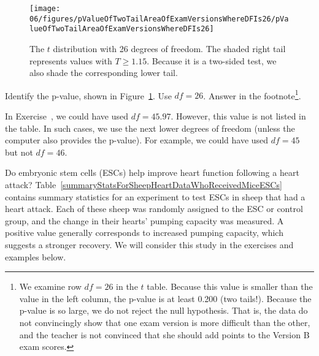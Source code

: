 \begin{figure}
\centering
\texttt{[image: 06/figures/pValueOfTwoTailAreaOfExamVersionsWhereDFIs26/pValueOfTwoTailAreaOfExamVersionsWhereDFIs26]}
\caption{The $t$ distribution with 26 degrees of freedom. The shaded right tail represents values with $T \geq 1.15$. Because it is a two-sided test, we also shade the corresponding lower tail.}
\label{pValueOfTwoTailAreaOfExamVersionsWhereDFIs26}
\end{figure}

\begin{exercise} \label{computeTwoTailAreaOfExamVersionsWhereDFIs26}
Identify the p-value, shown in Figure~\ref{pValueOfTwoTailAreaOfExamVersionsWhereDFIs26}. Use $df=26$. Answer in the footnote\footnote{We examine row $df=26$ in the $t$ table. Because this value is smaller than the value in the left column, the p-value is at least 0.200 (two tails!). Because the p-value is so large, we do not reject the null hypothesis. That is, the data do not convincingly show that one exam version is more difficult than the other, and the teacher is not convinced that she should add points to the Version B exam scores.}.
\end{exercise}

In Exercise~, we could have used $df=45.97$. However, this value is not listed in the table. In such cases, we use the next lower degrees of freedom (unless the computer also provides the p-value). For example, we could have used $df=45$ but not $df=46$. 

Do embryonic stem cells (ESCs) help improve heart function following a heart attack? Table~\ref{summaryStatsForSheepHeartDataWhoReceivedMiceESCs} contains summary statistics for an experiment to test ESCs in sheep that had a heart attack. Each of these sheep was randomly assigned to the ESC or control group, and the change in their hearts' pumping capacity was measured. A positive value generally corresponds to increased pumping capacity, which suggests a stronger recovery. We will consider this study in the exercises and examples below.

